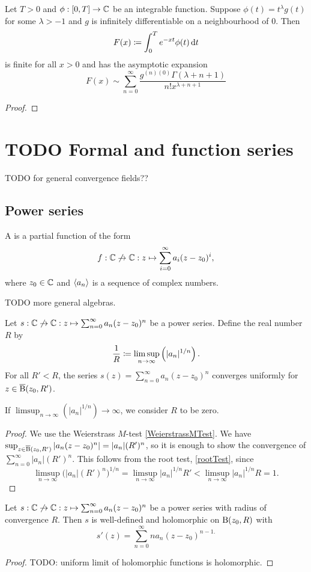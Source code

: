 \begin{theorem}
Let $T>0$ and $\phi: \interval{0,T} \to \C$ be an integrable function. Suppose $\phi(t) = t^\lambda g(t)$ for some $\lambda > -1$ and $g$ is infinitely differentiable on a neighbourhood of $0$. Then 
\[ F(x) \coloneqq \int_0^T e^{-xt}\phi(t)\operatorname{d \!}{t} \]
is finite for all $x > 0$ and has the asymptotic expansion
\[ F(x) \sim \sum_{n=0}^\infty \frac{g^{(n)(0)}\Gamma(\lambda + n + 1)}{n! x^{\lambda + n + 1}} \]
\end{theorem}
\begin{proof}

\end{proof}

\chapter{TODO Formal and function series}
TODO for general convergence fields??
\section{Power series}
\begin{definition}
A  is a partial function of the form
\[ f: \mathbb{C}\not\to \mathbb{C}: z\mapsto \sum_{i=0}^\infty a_i(z-z_0)^i, \]
where $z_0\in \mathbb{C}$ and $\left\langle a_n \right\rangle$ is a sequence of complex numbers. 
\end{definition}
TODO more general algebras.

\begin{proposition} \label{CauchyHadamard}
Let $s: \mathbb{C}\not\to \mathbb{C}: z\mapsto \sum_{n=0}^\infty a_n(z-z_0)^n$ be a power series. Define the real number $R$ by
\[ \frac{1}{R} \coloneqq \limsup_{n\to\infty}\left(|a_n|^{1/n}\right). \]
For all $R'< R$, the series $s(z) = \sum_{n=0}^\infty a_n(z-z_0)^n$ converges uniformly for $z\in \operatorname{\overline{B}}(z_0, R')$.
\end{proposition}
If $\limsup_{n\to\infty}\left(|a_n|^{1/n}\right) \to \infty$, we consider $R$ to be zero.
\begin{proof}
We use the Weierstrass $M$-test \ref{WeierstrassMTest}.
We have $\sup_{z\in \operatorname{\overline{B}}(z_0, R')}|a_n(z-z_0)^n| = |a_n|(R')^n$, so it is enough to show the convergence of $\sum_{n=0}^\infty |a_n|(R')^n$. This follows from the root test, \ref{rootTest}, since 
\[ \limsup_{n\to \infty}\big(|a_n|(R')^n\big)^{1/n}= \limsup_{n\to \infty}|a_n|^{1/n}R' < \limsup_{n\to \infty}|a_n|^{1/n}R = 1. \]
\end{proof}
\begin{corollary} \label{powerSeriesHolomorphic}
Let $s: \mathbb{C}\not\to \mathbb{C}: z\mapsto \sum_{n=0}^\infty a_n(z-z_0)^n$ be a power series with radius of convergence $R$. Then $s$ is well-defined and holomorphic on $\operatorname{B}(z_0,R)$ with
\[ s'(z) = \sum_{n=0}^\infty na_n(z-z_0)^{n-1.} \]
\end{corollary}
\begin{proof}
TODO: uniform limit of holomorphic functions is holomorphic.
\end{proof}

